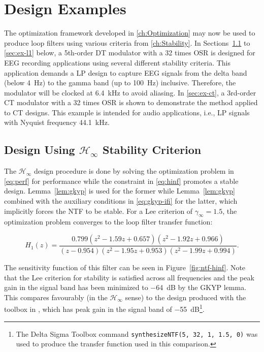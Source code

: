 
\chapter{Design Examples}
\label{ch:Examples}

The optimization framework developed in \autoref{ch:Optimization} may now be used to produce loop filters using various criteria from \autoref{ch:Stability}. In Sections~\ref{sec:ex-hinf} to \ref{sec:ex-l1} below, a 5th-order \gls{DT} modulator with a 32 times \gls{OSR} is designed for \gls{EEG} recording applications using several different stability criteria. This application demands a \gls{LP} design to capture \gls{EEG} signals from the delta band (below \SI{4}{\hertz}) to the gamma band (up to \SI{100}{\hertz}) inclusive. Therefore, the modulator will be clocked at \SI{6.4}{\kilo\hertz} to avoid aliasing. In \autoref{sec:ex-ct}, a 3rd-order \gls{CT} modulator with a 32 times \gls{OSR} is shown to demonstrate the method applied to \gls{CT} designs. This example is intended for audio applications, i.e., \gls{LP} signals with Nyquist frequency \SI{44.1}{\kilo\hertz}.


\section{Design Using $\mathcal{H}_\infty$ Stability Criterion}
\label{sec:ex-hinf}

The $\mathcal{H}_\infty$ design procedure is done by solving the optimization problem in \autoref{eq:perf} for performance while the constraint in \autoref{eq:hinf} promotes a stable design. Lemma~\ref{lem:gkyp} is used for the former while Lemma~\ref{lem:gkyp} combined with the auxiliary conditions in \autoref{eq:gkyp-ifi} for the latter, which implicitly forces the \gls{NTF} to be stable. For a Lee criterion of $\gamma_\infty = 1.5$, the optimization problem converges to the loop filter transfer function:

\begin{equation*}
	H_1(z) = \frac{0.799\left(z^2 - 1.59z + 0.657\right)\left(z^2 - 1.92z + 0.966\right)}{\left(z - 0.954\right)\left(z^2 - 1.95z + 0.953\right)\left(z^2 - 1.99z + 0.994\right)}.
\end{equation*}

The sensitivity function of this filter can be seen in Figure~\ref{fig:ntf-hinf}. Note that the Lee criterion for stability is satisfied across all frequencies and the peak gain in the signal band has been minimized to \SI{-64}{\deci\bel} by the \gls{GKYP} lemma. This compares favourably (in the $\mathcal{H}_\infty$ sense) to the design produced with the toolbox in \cite[Appx. B]{Schreier1997}, which has peak gain in the signal band of \SI{-55}{\deci\bel}\footnote{The Delta Sigma Toolbox command \texttt{synthesizeNTF(5,~32,~1,~1.5,~0)} was used to produce the transfer function used in this comparison.}.

